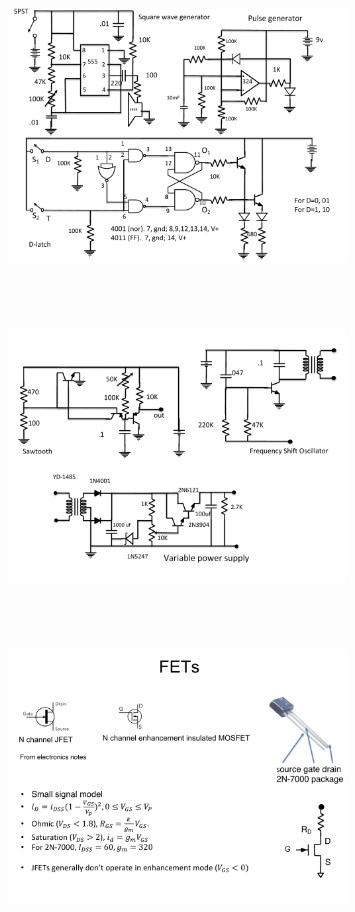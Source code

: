 \begin{figure} 
\center
\includegraphics[width=0.8\textwidth,natwidth=642,natheight=610, height=80mm, width=88mm]{circuit8.pdf}
\end{figure}
\begin{figure} 
\center
\includegraphics[width=0.8\textwidth,natwidth=642,natheight=610, height=80mm, width=88mm]{circuit9.pdf}
\end{figure}
\begin{figure} 
\center
\includegraphics[width=0.8\textwidth,natwidth=642,natheight=610, height=80mm, width=88mm]{circuit10.pdf}
\end{figure}

